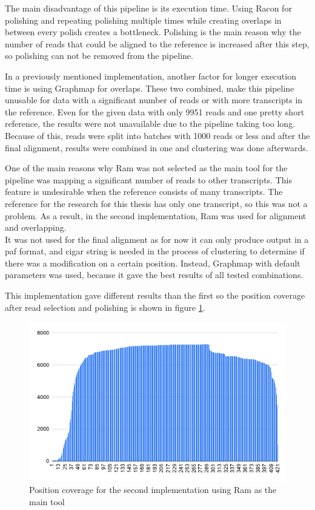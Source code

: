 \documentclass[times, utf8, zavrsni, numeric]{fer}
\begin{document}
The main disadvantage of this pipeline is its execution time. Using Racon 
for polishing and repeating polishing multiple times while creating overlaps
in between every polish creates a bottleneck. Polishing is the main reason 
why the number of reads that could be aligned to the reference is increased 
after this step, so polishing can not be removed from the pipeline.

In a previously mentioned implementation, another factor for longer execution time is
using Graphmap for overlaps. These two combined, make this pipeline unusable 
for data with a significant number of reads or with more transcripts in the
reference. Even for the given data with only 9951 reads and one pretty short 
reference, the results were not unavailable due to the pipeline taking too long. 
Because of this, reads were split into batches with 1000 reads or less and 
after the final alignment, results were combined in one and clustering was done 
afterwards. 

One of the main reasons why Ram was not selected as the main tool for the pipeline
was mapping a significant number of reads to other transcripts. 
This feature is undesirable when the reference consists of many transcripts. 
The reference for the research for this thesis has only one transcript, so 
this was not a problem. As a result, in the second implementation, Ram was 
used for alignment and overlapping. \\
It was not used for the final alignment as for now it can only produce output in a
paf format, and cigar string is needed in the process of clustering to determine 
if there was a modification on a certain position. Instead, Graphmap with 
default parameters was used, because it gave the best results of all 
tested combinations. 

This implementation gave different results than the first so the position 
coverage after read selection and polishing is shown in figure \ref{fig:posCoverageRam}.

\begin{figure}[H]
    \centering
    \includegraphics[width=\linewidth]{figures/ram_pos_coverage}
    \caption{Position coverage for the second implementation using Ram as the main tool}
    \label{fig:posCoverageRam}
\end{figure}
\end{document}
